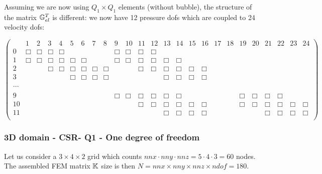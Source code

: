Assuming we are now using $Q_1\times Q_1$ elements (without bubble), 
the structure of the matrix ${\mathbb{G}}_{el}^T$ is different: we now have 12 pressure dofs 
which are coupled to 24 velocity dofs:
\begin{scriptsize}
\begin{equation}
\left(
\begin{array}{ccccccccccccccccccccccccc}
 & 1 & 2 & 3 & 4 & 5 & 6 & 7 & 8 & 9 & 10 & 11 & 12 & 13 & 14 & 15 & 16 & 17 & 18 & 19 & 20 & 21 & 22 & 23 & 24    \\
0 &\Box&\Box & \Box&\Box &  &  &  &  & \Box&\Box & \Box&\Box &  &  &  &  &  &  &  &  &  &  &  &  \\
1 & \Box&\Box & \Box&\Box & \Box  & \Box  &  &  & \Box&\Box & \Box&\Box & \Box  & \Box  &  &  &  &  &  &  &  &  &  & \\
2 &  & & \Box&\Box & \Box  & \Box  & \Box  & \Box  & & & \Box&\Box & \Box  & \Box  & \Box  &\Box  &  &  &  &  &  &  &  & \\ 
3 &  & & &  & \Box  & \Box  & \Box  & \Box  & & & & & \Box  & \Box  & \Box  &\Box  &  &  &  &  &  &  &  & \\ 
\\
... \\
\\
9 & & & & & & & & &\Box &\Box &\Box &\Box & \Box  & \Box &  &  & & &\Box &\Box & \Box &\Box & &  \\
10 & & & & & & & & & & &\Box &\Box & \Box  & \Box & \Box & \Box & & &\Box &\Box & \Box &\Box &\Box & \Box \\
11 & & & & & & & & & & & & & \Box  & \Box & \Box & \Box & & & & & \Box &\Box &\Box & \Box \\
\end{array}
\right)
\end{equation} 
\end{scriptsize}


\subsubsection{3D domain - CSR- Q1 - One degree of freedom}

Let us consider a $3\times4\times2$ grid which counts 
$nnx\cdot nny \cdot nnz = 5 \cdot 4\cdot 3=60$ nodes.
The assembled FEM matrix ${\mathbb{K}}$ size is then 
$N=nnx\times nny\times nnz \times ndof=180$.

\begin{center}

\end{center}



